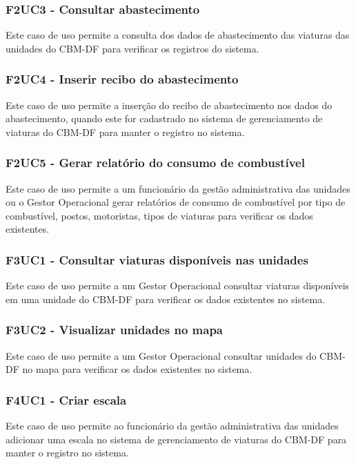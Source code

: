   \subsubsection{F2UC3 - Consultar abastecimento}
Este caso de uso permite a consulta dos dados de abastecimento das viaturas das unidades do CBM-DF para verificar os registros
do sistema.

  \subsubsection{F2UC4 - Inserir recibo do abastecimento}
Este caso de uso permite a inserção do recibo de abastecimento nos dados do abastecimento, quando este for cadastrado no 
sistema de gerenciamento de viaturas do CBM-DF para manter o registro no sistema.

  \subsubsection{F2UC5 - Gerar relatório do consumo de combustível}
Este caso de uso permite a um funcionário da gestão administrativa das unidades ou o Gestor Operacional gerar relatórios de
consumo de combustível por tipo de combustível, postos, motoristas, tipos de viaturas para verificar os dados existentes. 

  \subsubsection{F3UC1 - Consultar viaturas disponíveis nas unidades}
Este caso de uso permite a um Gestor Operacional consultar viaturas disponíveis em uma unidade do CBM-DF para verificar os 
dados existentes no sistema.

  \subsubsection{F3UC2 - Visualizar unidades no mapa}
Este caso de uso permite a um Gestor Operacional consultar unidades do CBM-DF no mapa para verificar os dados existentes no sistema.

  \subsubsection{F4UC1 - Criar escala}
Este caso de uso permite ao funcionário da gestão administrativa das unidades adicionar uma escala no sistema de
gerenciamento de viaturas do CBM-DF para manter o registro no sistema.

